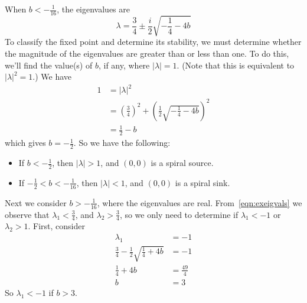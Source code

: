 \documentclass{book}
\begin{document}
When $b < -\frac{1}{16}$, the eigenvalues are
\begin{equation}
   \lambda = \frac{3}{4} \pm \frac{i}{2}\sqrt{-\frac{1}{4}-4b}
\end{equation}
To classify the fixed point and determine its stability,
we must determine whether the magnitude of the eigenvalues
are greater than or less than one.  To do this, we'll find the
value(s) of $b$, if any, where $|\lambda| = 1$.
(Note that this is equivalent to $|\lambda|^2 = 1$.)
We have
\begin{equation}
\begin{split}
  1 & = |\lambda|^2 \\
    & = \left(\frac{3}{4}\right)^2 + \left(\frac{1}{2}\sqrt{-\frac{1}{4}-4b} \right)^2 \\
    & = \frac{1}{2} - b
\end{split}
\end{equation}
which gives $b=-\frac{1}{2}$.
So we have the following:
\begin{itemize}
\item
If $b < -\frac{1}{2}$, then $|\lambda| > 1$, and $(0,0)$ is a spiral source.
\item
If $-\frac{1}{2} < b < -\frac{1}{16}$, then $|\lambda| < 1$, and $(0,0)$
is a spiral sink.
\end{itemize}
Next we consider $b > -\frac{1}{16}$, where the eigenvalues are real.
From~\eqref{eqn:exeigvals} we observe that $\lambda_1 < \frac{3}{4}$,
and $\lambda_2 > \frac{3}{4}$, so we only need to determine
if $\lambda_1 < -1$ or  $\lambda_2 > 1$.
First, consider
\begin{equation}
\begin{split}
   \lambda_1 & = -1 \\
   \frac{3}{4} - \frac{1}{2} \sqrt{\frac{1}{4}+4b} & = -1 \\
   \frac{1}{4}+4b & = \frac{49}{4} \\
   b & = 3
\end{split}
\end{equation}
So $\lambda_1 < -1$ if $b > 3$.
\end{document}
